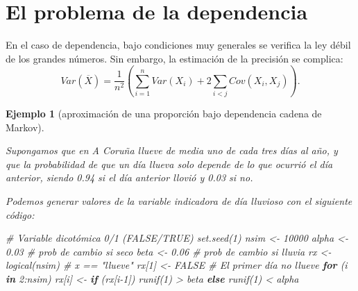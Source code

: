\documentclass[
]{book}
\newenvironment{Shaded}{\begin{snugshade}}{\end{snugshade}}
\newcommand{\CommentTok}[1]{\textcolor[rgb]{0.56,0.35,0.01}{\textit{#1}}}
\newcommand{\ConstantTok}[1]{\textcolor[rgb]{0.00,0.00,0.00}{#1}}
\newcommand{\ControlFlowTok}[1]{\textcolor[rgb]{0.13,0.29,0.53}{\textbf{#1}}}
\newcommand{\DecValTok}[1]{\textcolor[rgb]{0.00,0.00,0.81}{#1}}
\newcommand{\FloatTok}[1]{\textcolor[rgb]{0.00,0.00,0.81}{#1}}
\newcommand{\FunctionTok}[1]{\textcolor[rgb]{0.00,0.00,0.00}{#1}}
\newcommand{\NormalTok}[1]{#1}
\newcommand{\OtherTok}[1]{\textcolor[rgb]{0.56,0.35,0.01}{#1}}
\newcommand{\SpecialCharTok}[1]{\textcolor[rgb]{0.00,0.00,0.00}{#1}}
\theoremstyle{break}
\newtheorem{example}{Ejemplo}[chapter]
\theoremstyle{nonumberplain}
\begin{document}
\hypertarget{el-problema-de-la-dependencia}{%
\section{El problema de la dependencia}\label{el-problema-de-la-dependencia}}

En el caso de dependencia, bajo condiciones muy generales se verifica la ley débil de los grandes números.
Sin embargo, la estimación de la precisión se complica:
\[Var\left( \overline{X}\right) =\frac{1}{n^{2}}\left( 
\sum_{i=1}^{n}Var\left( X_{i} \right) + 2\sum_{i<j}Cov\left( X_{i},X_{j}\right) \right).\]

\begin{example}[aproximación de una proporción bajo dependencia cadena de Markov]
\protect\hypertarget{exm:mmc}{}\label{exm:mmc}

Supongamos que en A Coruña llueve de media uno de cada tres días al año,
y que la probabilidad de que un día llueva solo depende de lo que ocurrió el día anterior,
siendo 0.94 si el día anterior llovió y 0.03 si no.

Podemos generar valores de la variable indicadora de día lluvioso con el siguiente código:

\begin{Shaded}
\begin{Highlighting}[]
\CommentTok{\# Variable dicotómica 0/1 (FALSE/TRUE)  }
\FunctionTok{set.seed}\NormalTok{(}\DecValTok{1}\NormalTok{)}
\NormalTok{nsim }\OtherTok{\textless{}{-}} \DecValTok{10000}
\NormalTok{alpha }\OtherTok{\textless{}{-}} \FloatTok{0.03} \CommentTok{\# prob de cambio si seco}
\NormalTok{beta }\OtherTok{\textless{}{-}} \FloatTok{0.06}  \CommentTok{\# prob de cambio si lluvia}
\NormalTok{rx }\OtherTok{\textless{}{-}} \FunctionTok{logical}\NormalTok{(nsim) }\CommentTok{\# x == "llueve"}
\NormalTok{rx[}\DecValTok{1}\NormalTok{] }\OtherTok{\textless{}{-}} \ConstantTok{FALSE} \CommentTok{\# El primer día no llueve}
\ControlFlowTok{for}\NormalTok{ (i }\ControlFlowTok{in} \DecValTok{2}\SpecialCharTok{:}\NormalTok{nsim)}
\NormalTok{  rx[i] }\OtherTok{\textless{}{-}} \ControlFlowTok{if}\NormalTok{ (rx[i}\DecValTok{{-}1}\NormalTok{]) }\FunctionTok{runif}\NormalTok{(}\DecValTok{1}\NormalTok{) }\SpecialCharTok{\textgreater{}}\NormalTok{ beta }\ControlFlowTok{else} \FunctionTok{runif}\NormalTok{(}\DecValTok{1}\NormalTok{) }\SpecialCharTok{\textless{}}\NormalTok{ alpha}
\end{Highlighting}
\end{Shaded}


\end{example}
\end{document}
